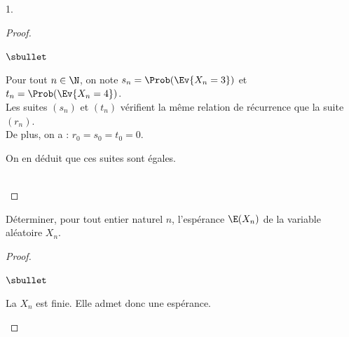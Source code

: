 \documentclass[11pt]{article}%
\begin{document}
\begin{noliste}{1.}
  \begin{proof}~%
    \begin{noliste}{$\sbullet$}
    \item Pour tout $n \in \N$, on note $s_n = \Prob(\Ev{X_n = 3})$ et
      $t_n = \Prob(\Ev{X_n = 4})$.\\
      Les suites $(s_n)$ et $(t_n)$ vérifient la même relation de
      récurrence que la suite $(r_n)$.\\
      De plus, on a : $r_0 = s_0 = t_0 = 0$.
    \item On en déduit que ces suites sont égales.
    \end{noliste}
    ~\\[-1cm]
  \end{proof}



  
\item Déterminer, pour tout entier naturel $n$, l'espérance
  $\E(X_{n})$ de la variable aléatoire $X_{n}$.

  \begin{proof}~%
    \begin{noliste}{$\sbullet$}
    \item La \var $X_n$ est finie. Elle admet donc une espérance.


\end{noliste}
\end{proof}
\end{noliste}
\end{document}
